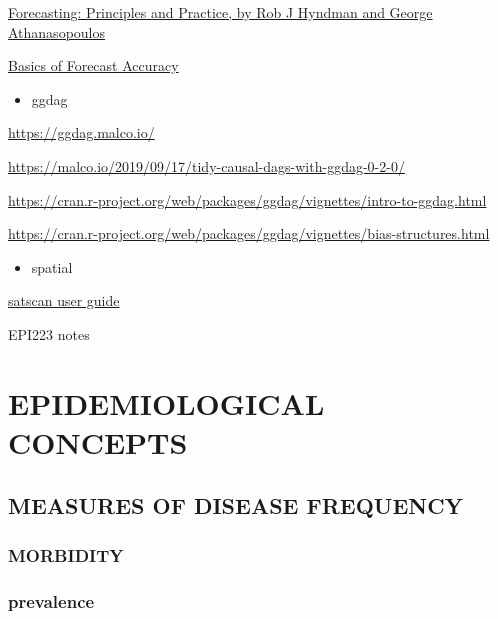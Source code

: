 \documentclass[
]{article}
\providecommand{\tightlist}{%
  \setlength{\itemsep}{0pt}\setlength{\parskip}{0pt}}
\begin{document}
\href{https://otexts.com/fpp2/}{Forecasting: Principles and Practice, by
Rob J Hyndman and George Athanasopoulos}

\href{https://medium.com/analytics-vidhya/basics-of-forecast-accuracy-db704b0b001b\#:~:text=A\%20simple\%20measure\%20of\%20forecast,known\%20as\%20Mean\%20Forecast\%20Error.\&text=The\%20MFE\%20for\%20this\%20forecasting,more\%20than\%20the\%20forecast\%20values.}{Basics
of Forecast Accuracy}

\begin{itemize}
\tightlist
\item
  ggdag
\end{itemize}

\url{https://ggdag.malco.io/}

\url{https://malco.io/2019/09/17/tidy-causal-dags-with-ggdag-0-2-0/}

\url{https://cran.r-project.org/web/packages/ggdag/vignettes/intro-to-ggdag.html}

\url{https://cran.r-project.org/web/packages/ggdag/vignettes/bias-structures.html}

\begin{itemize}
\tightlist
\item
  spatial
\end{itemize}

\href{https://www.satscan.org/cgi-bin/satscan/register.pl/SaTScan_Users_Guide.pdf?todo=process_userguide_download}{satscan
user guide}

EPI223 notes

\hypertarget{epidemiological-concepts}{%
\section{\texorpdfstring{\textbf{EPIDEMIOLOGICAL
CONCEPTS}}{EPIDEMIOLOGICAL CONCEPTS}}\label{epidemiological-concepts}}

\hypertarget{measures-of-disease-frequency}{%
\subsection{MEASURES OF DISEASE
FREQUENCY}\label{measures-of-disease-frequency}}

\hypertarget{morbidity}{%
\subsubsection{MORBIDITY}\label{morbidity}}

\hypertarget{prevalence}{%
\subsubsection{prevalence}\label{prevalence}}
\end{document}
